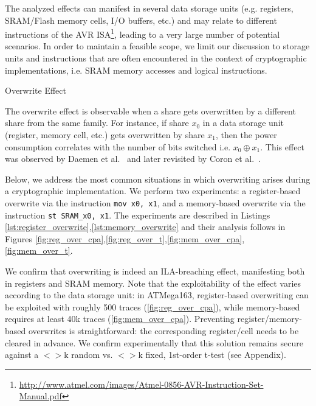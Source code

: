 The analyzed effects can manifest in several data storage units (e.g. registers, SRAM/Flash memory cells, I/O buffers, etc.) and may relate to different instructions of the AVR ISA\footnote{\url{http://www.atmel.com/images/Atmel-0856-AVR-Instruction-Set-Manual.pdf}}, leading to a very large number of potential scenarios. In order to maintain a feasible scope, we limit our discussion to storage units and instructions that are often encountered in the context of cryptographic implementations, i.e. SRAM memory accesses and logical instructions.
\begin{subsection}{Overwrite Effect}\label{overwrite}

The overwrite effect is observable when a share gets overwritten by a different share from the same family. For instance, if share $x_0$ in a data storage unit (register, memory cell, etc.) gets overwritten by share $x_1$, then the power consumption correlates with the number of bits switched i.e. $x_0 \oplus x_1$. This effect was observed by Daemen et al.~\cite{noteonsca} and later revisited by Coron et al.~\cite{DBLP:conf/cosade/CoronGPRRV12}.

Below, we address the most common situations in which overwriting arises during a cryptographic implementation. We perform two experiments: a register-based overwrite via the instruction \texttt{mov x0, x1}, and a memory-based overwrite via the instruction \texttt{st SRAM\_x0,  x1}. The experiments are described in Listings \ref{lst:register_overwrite},\ref{lst:memory_overwrite} and their analysis follows in Figures \ref{fig:reg_over_cpa},\ref{fig:reg_over_t},\ref{fig:mem_over_cpa},\ref{fig:mem_over_t}.

We confirm that overwriting is indeed an ILA-breaching effect, manifesting both in registers and SRAM memory. Note that the exploitability of the effect varies according to the data storage unit: in ATMega163, register-based overwriting can be exploited with roughly 500 traces (\ref{fig:reg_over_cpa}), while memory-based requires at least 40k traces (\ref{fig:mem_over_cpa}). Preventing register/memory-based overwrites is straightforward: the corresponding register/cell needs to be cleared in advance. We confirm experimentally that this solution remains secure against a $<>$k random vs. $<>$k fixed, 1st-order t-test (see Appendix).


\end{subsection}
